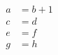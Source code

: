 \documentclass{article}
\begin{document}
\begin{gather}
\begin{aligned}
  a &=b + 1 \\
  c &=d \\
  e &=f \\
  g &=h
\end{aligned}
\end{gather}
\end{document}
